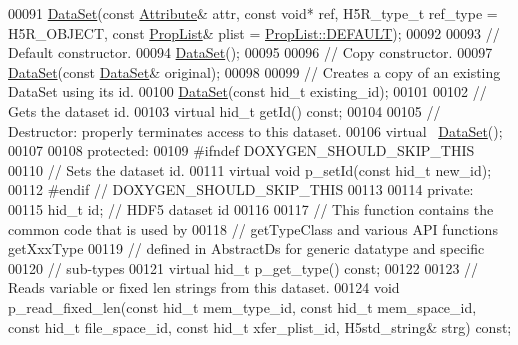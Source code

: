 \begin{DoxyCode}
00091         \hyperlink{class_h5_1_1_data_set}{DataSet}(\textcolor{keyword}{const} \hyperlink{class_h5_1_1_attribute}{Attribute}& attr, \textcolor{keyword}{const} \textcolor{keywordtype}{void}* ref, H5R\_type\_t ref\_type = H5R\_OBJECT, \textcolor{keyword}{
      const} \hyperlink{class_h5_1_1_prop_list}{PropList}& plist = \hyperlink{class_h5_1_1_prop_list_ae52af66ce82af0ea7e6dc57148c56241}{PropList::DEFAULT});
00092 
00093         \textcolor{comment}{// Default constructor.}
00094         \hyperlink{class_h5_1_1_data_set}{DataSet}();
00095 
00096         \textcolor{comment}{// Copy constructor.}
00097         \hyperlink{class_h5_1_1_data_set}{DataSet}(\textcolor{keyword}{const} \hyperlink{class_h5_1_1_data_set}{DataSet}& original);
00098 
00099         \textcolor{comment}{// Creates a copy of an existing DataSet using its id.}
00100         \hyperlink{class_h5_1_1_data_set}{DataSet}(\textcolor{keyword}{const} hid\_t existing\_id);
00101 
00102         \textcolor{comment}{// Gets the dataset id.}
00103         \textcolor{keyword}{virtual} hid\_t getId() \textcolor{keyword}{const};
00104 
00105         \textcolor{comment}{// Destructor: properly terminates access to this dataset.}
00106         \textcolor{keyword}{virtual} ~\hyperlink{class_h5_1_1_data_set}{DataSet}();
00107 
00108    \textcolor{keyword}{protected}:
00109 \textcolor{preprocessor}{#ifndef DOXYGEN\_SHOULD\_SKIP\_THIS}
00110         \textcolor{comment}{// Sets the dataset id.}
00111         \textcolor{keyword}{virtual} \textcolor{keywordtype}{void} p\_setId(\textcolor{keyword}{const} hid\_t new\_id);
00112 \textcolor{preprocessor}{#endif // DOXYGEN\_SHOULD\_SKIP\_THIS}
00113 
00114    \textcolor{keyword}{private}:
00115         hid\_t id;       \textcolor{comment}{// HDF5 dataset id}
00116 
00117         \textcolor{comment}{// This function contains the common code that is used by}
00118         \textcolor{comment}{// getTypeClass and various API functions getXxxType}
00119         \textcolor{comment}{// defined in AbstractDs for generic datatype and specific}
00120         \textcolor{comment}{// sub-types}
00121         \textcolor{keyword}{virtual} hid\_t p\_get\_type() \textcolor{keyword}{const};
00122 
00123         \textcolor{comment}{// Reads variable or fixed len strings from this dataset.}
00124         \textcolor{keywordtype}{void} p\_read\_fixed\_len(\textcolor{keyword}{const} hid\_t mem\_type\_id, \textcolor{keyword}{const} hid\_t mem\_space\_id, \textcolor{keyword}{const} hid\_t file\_space\_id,
       \textcolor{keyword}{const} hid\_t xfer\_plist\_id, H5std\_string& strg) \textcolor{keyword}{const};

\end{DoxyCode}
